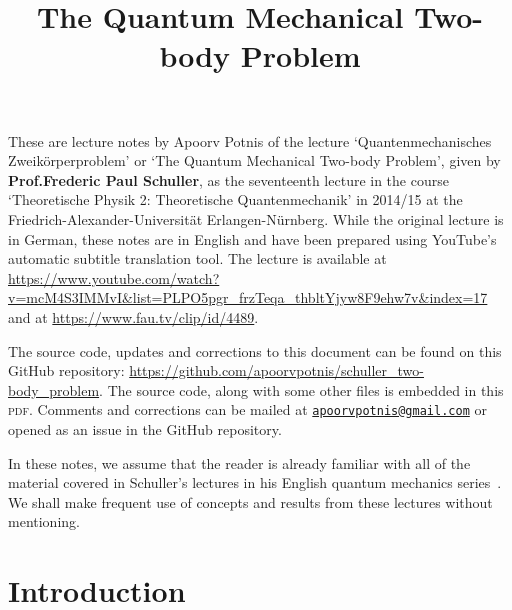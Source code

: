 \documentclass[12pt, a4 paper]{article}
\title{The Quantum Mechanical Two-body Problem}
\author{}
\date{\vspace{-5ex}}
\theoremstyle{definition}
\begin{document}
    \maketitle

    These are lecture notes by Apoorv Potnis of the lecture `Quantenmechanisches Zweikörperproblem' or `The Quantum Mechanical Two-body Problem', given by \textbf{Prof.\@ Frederic Paul Schuller}, as the seventeenth lecture in the course `Theoretische Physik 2: Theoretische Quantenmechanik' in 2014/15 at the Friedrich-Alexander-Universität Erlangen-Nürnberg. While the original lecture is in German, these notes are in English and have been prepared using YouTube's automatic subtitle translation tool. The lecture is available at \url{https://www.youtube.com/watch?v=mcM4S3IMMvI&list=PLPO5pgr_frzTeqa_thbltYjyw8F9ehw7v&index=17} and at \url{https://www.fau.tv/clip/id/4489}.

    The source code, updates and corrections to this document can be found on this GitHub repository: \url{https://github.com/apoorvpotnis/schuller_two-body_problem}. The source code, along with some other files is embedded in this \textsc{pdf}. Comments and corrections can be mailed at \href{mailto:apoorvpotnis@gmail.com}{\texttt{apoorvpotnis@gmail.com}} or opened as an issue in the GitHub repository.

    In these notes, we assume that the reader is already familiar with all of the material covered in Schuller's lectures in his English quantum mechanics series~\cite{SchullerVideos, Schuller}. We shall make frequent use of concepts and results from these lectures without mentioning.

    \tableofcontents

    \section{Introduction}
\end{document}
